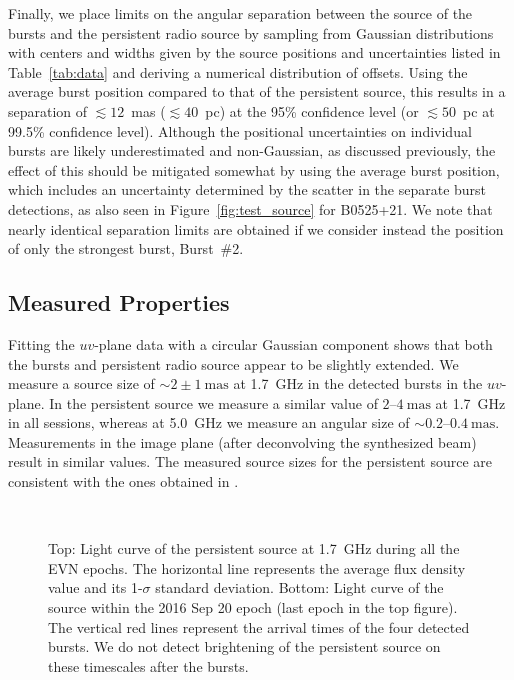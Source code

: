 \documentclass[twocolumn]{aastex61}
\begin{document}
Finally, we place limits on the angular separation between the source of the bursts and the persistent radio source by sampling from Gaussian distributions with centers and widths given by the source positions and uncertainties listed in Table~\ref{tab:data} and deriving a numerical distribution of offsets.  Using the average burst position compared to that of the persistent source, this results in a separation of $\lesssim 12$~mas ($\lesssim 40$~pc) at the 95\% confidence level (or $\lesssim 50$~pc at 99.5\% confidence level).  Although the positional uncertainties on individual bursts are likely underestimated and non-Gaussian, as discussed previously, the effect of this should be mitigated somewhat by using the average burst position, which includes an uncertainty determined by the scatter in the separate burst detections, as also seen in Figure~\ref{fig:test_source} for B0525+21. We note that nearly identical separation limits are obtained if we consider instead the position of only the strongest burst, Burst~\#2.

\subsection{Measured Properties}

Fitting the $uv$-plane data with a circular Gaussian component shows that both the bursts and persistent radio source appear to be slightly extended. We measure a source size of $\sim 2 \pm 1~\mathrm{mas}$ at 1.7~GHz in the detected bursts in the $uv$-plane. In the persistent source we measure a similar value of $2$--$4~\mathrm{mas}$ at 1.7~GHz in all sessions, whereas at 5.0~GHz we measure an angular size of $\sim 0.2$--$0.4~\mathrm{mas}$. Measurements in the image plane (after deconvolving the synthesized beam) result in similar values. The measured source sizes for the persistent source are consistent with the ones obtained in \citet{chatterjee2017}.

\begin{figure}[t!]
	\\
	\caption{Top: Light curve of the persistent source at 1.7~GHz during all the EVN epochs. The horizontal line represents the average flux density value and its 1-$\sigma$ standard deviation. Bottom: Light curve of the source within the 2016 Sep 20 epoch (last epoch in the top figure). The vertical red lines represent the arrival times of the four detected bursts. We do not detect brightening of the persistent source on these timescales after the bursts.
	\label{fig:lightcurve}}
\end{figure}
\end{document}

